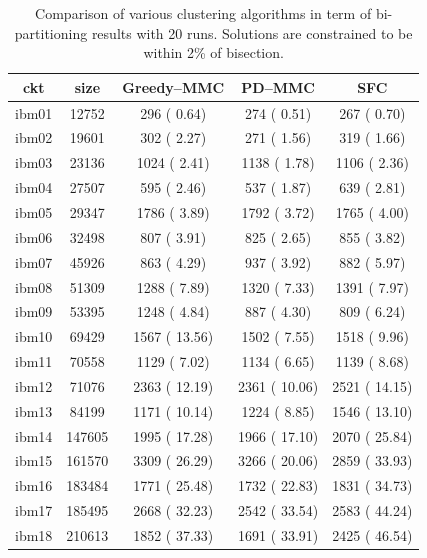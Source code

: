 \documentclass[journal]{IEEEtran}
\begin{document}
\begin{table}
\renewcommand{\arraystretch}{1.3}
\caption{Comparison of various clustering algorithms in term of
  bi-partitioning results with 20 runs. Solutions are constrained to
  be within 2\% of bisection.} 
\label{clustering_2}
\centering
\begin{tabular}{|c||c|c|c|c|}
\hline
\bfseries ckt & \bfseries size & 
              \bfseries Greedy--MMC & \bfseries PD--MMC & \bfseries SFC  \\
\hline\hline
ibm01 &  12752 &  296 (  0.64) &  274 (  0.51) &  267 (  0.70)  \\
ibm02 &  19601 &  302 (  2.27) &  271 (  1.56) &  319 (  1.66)  \\
ibm03 &  23136 & 1024 (  2.41) & 1138 (  1.78) & 1106 (  2.36)  \\
ibm04 &  27507 &  595 (  2.46) &  537 (  1.87) &  639 (  2.81)  \\
ibm05 &  29347 & 1786 (  3.89) & 1792 (  3.72) & 1765 (  4.00)  \\
ibm06 &  32498 &  807 (  3.91) &  825 (  2.65) &  855 (  3.82)  \\
ibm07 &  45926 &  863 (  4.29) &  937 (  3.92) &  882 (  5.97)  \\
ibm08 &  51309 & 1288 (  7.89) & 1320 (  7.33) & 1391 (  7.97)  \\
ibm09 &  53395 & 1248 (  4.84) &  887 (  4.30) &  809 (  6.24)  \\
ibm10 &  69429 & 1567 ( 13.56) & 1502 (  7.55) & 1518 (  9.96)  \\
ibm11 &  70558 & 1129 (  7.02) & 1134 (  6.65) & 1139 (  8.68)  \\
ibm12 &  71076 & 2363 ( 12.19) & 2361 ( 10.06) & 2521 ( 14.15)  \\
ibm13 &  84199 & 1171 ( 10.14) & 1224 (  8.85) & 1546 ( 13.10)  \\
ibm14 & 147605 & 1995 ( 17.28) & 1966 ( 17.10) & 2070 ( 25.84)  \\
ibm15 & 161570 & 3309 ( 26.29) & 3266 ( 20.06) & 2859 ( 33.93)  \\
ibm16 & 183484 & 1771 ( 25.48) & 1732 ( 22.83) & 1831 ( 34.73)  \\
ibm17 & 185495 & 2668 ( 32.23) & 2542 ( 33.54) & 2583 ( 44.24)  \\
ibm18 & 210613 & 1852 ( 37.33) & 1691 ( 33.91) & 2425 ( 46.54)  \\
\hline
\end{tabular}
\end{table}
\end{document}
